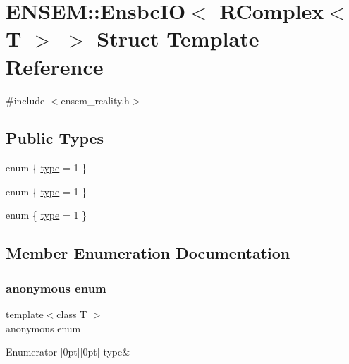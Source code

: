 \hypertarget{structENSEM_1_1EnsbcIO_3_01RComplex_3_01T_01_4_01_4}{}\section{E\+N\+S\+EM\+:\+:Ensbc\+IO$<$ R\+Complex$<$ T $>$ $>$ Struct Template Reference}
\label{structENSEM_1_1EnsbcIO_3_01RComplex_3_01T_01_4_01_4}


{\ttfamily \#include $<$ensem\+\_\+reality.\+h$>$}

\subsection*{Public Types}
\begin{DoxyCompactItemize}
\item 
enum \{ \mbox{\hyperlink{structENSEM_1_1EnsbcIO_3_01RComplex_3_01T_01_4_01_4_a34e40c93f4ac747ab8127c925f144444a5b3708c9fa3a312e76feca278f14a7d3}{type}} = 1
 \}
\item 
enum \{ \mbox{\hyperlink{structENSEM_1_1EnsbcIO_3_01RComplex_3_01T_01_4_01_4_a34e40c93f4ac747ab8127c925f144444a5b3708c9fa3a312e76feca278f14a7d3}{type}} = 1
 \}
\item 
enum \{ \mbox{\hyperlink{structENSEM_1_1EnsbcIO_3_01RComplex_3_01T_01_4_01_4_a34e40c93f4ac747ab8127c925f144444a5b3708c9fa3a312e76feca278f14a7d3}{type}} = 1
 \}
\end{DoxyCompactItemize}


\subsection{Member Enumeration Documentation}
\mbox{\label{structENSEM_1_1EnsbcIO_3_01RComplex_3_01T_01_4_01_4_aff9ef4c8a5fd9ee825329a4a5f6a8cf0}} 
\subsubsection{\texorpdfstring{anonymous enum}{anonymous enum}}
{\footnotesize\ttfamily template$<$class T $>$ \\
anonymous enum}

\begin{DoxyEnumFields}{Enumerator}
[0pt][0pt]{}\mbox{\label{structENSEM_1_1EnsbcIO_3_01RComplex_3_01T_01_4_01_4_a34e40c93f4ac747ab8127c925f144444a5b3708c9fa3a312e76feca278f14a7d3}} 
type&\\
\hline

\end{DoxyEnumFields}
\mbox{\label{structENSEM_1_1EnsbcIO_3_01RComplex_3_01T_01_4_01_4_a0cbe3c6ab0e71cb9037d288e6b427266}} 

